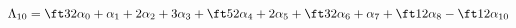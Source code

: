 \begin{equation}\label{Lambda10}
\Lambda_{10} = \ft32 \alpha_0 + \alpha_1 + 2\alpha_2 + 3 \alpha_3 + \ft52 \alpha_4 +
    2 \alpha_5 + \ft32 \alpha_6 + \alpha_7 + \ft12 \alpha_8 - \ft12 \alpha_{10}
\end{equation}


